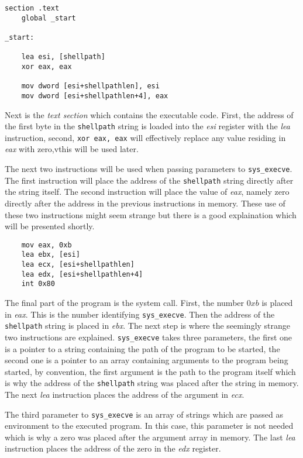\documentclass[11pt,twoside]{eitExjobb}
\begin{document}
\begin{verbatim}
section .text
    global _start

_start:

    lea esi, [shellpath]
    xor eax, eax

    mov dword [esi+shellpathlen], esi
    mov dword [esi+shellpathlen+4], eax 

\end{verbatim}

\noindent Next is the \emph{text section} which contains the executable code. First, the address of the first byte in the \texttt{shellpath} string is loaded into the \emph{esi} register with the \emph{lea} instruction, second, \texttt{xor eax, eax} will effectively replace any value residing in \emph{eax} with zero,vthis will be used later. 

The next two instructions will be used when passing parameters to \texttt{sys\_execve}. The first instruction will place the address of the \texttt{shellpath} string directly after the string itself. The second instruction will place the value of \emph{eax}, namely zero directly after the address in the previous instructions in memory. These use of these two instructions might seem strange but there is a good explaination which will be presented shortly.

\begin{verbatim}
    mov eax, 0xb
    lea ebx, [esi]
    lea ecx, [esi+shellpathlen]
    lea edx, [esi+shellpathlen+4]
    int 0x80
\end{verbatim}

\noindent The final part of the program is the system call. First, the number $0xb$ is placed in \emph{eax}. This is the number identifying \texttt{sys\_execve}. Then the address of the \texttt{shellpath} string is placed in \emph{ebx}. The next step is where the seemingly strange two instructions are explained. \texttt{sys\_execve} takes three parameters, the first one is a pointer to a string containing the path of the program to be started, the second one is a pointer to an array containing arguments to the program being started, by convention, the first argument is the path to the program itself which is why the address of the \texttt{shellpath} string was placed after the string in memory. The next \emph{lea} instruction places the address of the argument in \emph{ecx}. 

The third parameter to \texttt{sys\_execve} is an array of strings which are passed as environment to the executed program. In this case, this parameter is not needed which is why a zero was placed after the argument array in memory. The last \emph{lea} instruction places the address of the zero in the \emph{edx} register.
\end{document}
